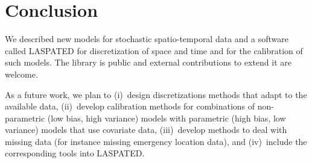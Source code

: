 \documentclass[article]{jss}
\begin{document}
\section{Conclusion}

We described new models for stochastic spatio-temporal data and a software called LASPATED for discretization of space and time and for the calibration of such models.
The library is public and external contributions to extend it are welcome.

As a future work, we plan to (i)~design discretizations methods that adapt to the available data, (ii)~develop calibration methods for combinations of non-parametric (low bias, high variance) models with parametric (high bias, low variance) models that use covariate data, (iii)~develop methods to deal with missing data (for instance missing emergency location data), and (iv)~include the corresponding tools into LASPATED.



\end{document}
